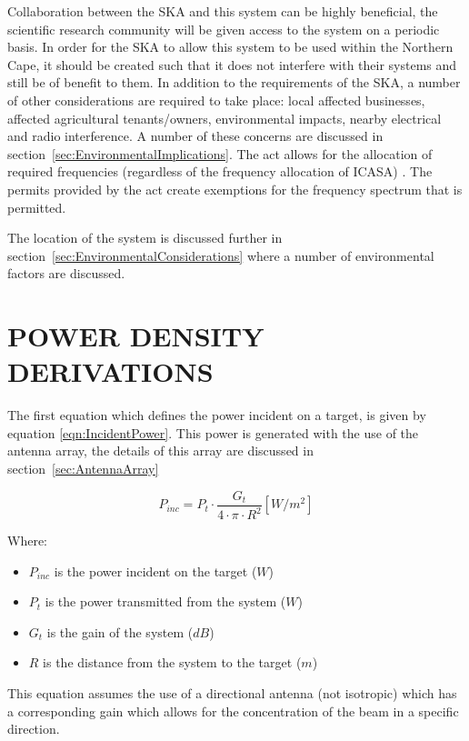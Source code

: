 \documentclass[11pt]{witseiepaper}
\begin{document}
\begin{bibunit}[witseie]
Collaboration between the SKA and this system can be highly beneficial, the scientific research community will be given access to the system on a periodic basis. In order for the SKA to allow this system to be used within the Northern Cape, it should be created such that it does not interfere with their systems and still be of benefit to them. In addition to the requirements of the SKA, a number of other considerations are required to take place: local affected businesses, affected agricultural tenants/owners, environmental impacts, nearby electrical and radio interference. A number of these concerns are discussed in section~\ref{sec:EnvironmentalImplications}.
The act allows for the allocation of required frequencies (regardless of the frequency allocation of ICASA) \cite{SKAAct}. The permits provided by the act create exemptions for the frequency spectrum that is permitted.

The location of the system is discussed further in section~\ref{sec:EnvironmentalConsiderations} where a number of environmental factors are discussed.

\section{POWER DENSITY DERIVATIONS} \label{sec:PowerDensityDerivations}
The first equation which defines the power incident on a target, is given by equation \ref{eqn:IncidentPower}. This power is generated with the use of the antenna array, the details of this array are discussed in section~\ref{sec:AntennaArray}

\begin{equation} \label{eqn:IncidentPower}
P_{inc} = P_t \cdot \frac{G_{t}}{4 \cdot \pi \cdot R^2} [W/m^2]
\end{equation}

Where:
\begin{itemize}
    \item $P_{inc}$ is the power incident on the target ($W$)
    \item $P_t$ is the power transmitted from the system ($W$)
    \item $G_t$ is the gain of the system ($dB$)
    \item $R$ is the distance from the system to the target ($m$)
\end{itemize}

This equation assumes the use of a directional antenna (not isotropic) which has a corresponding gain which allows for the concentration of the beam in a specific direction.


\end{bibunit}
\end{document}
